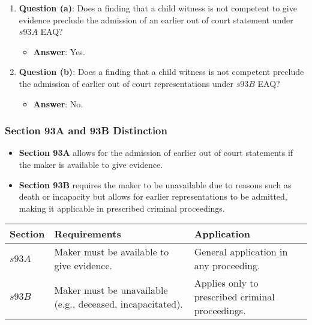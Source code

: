 \begin{enumerate}
\def\labelenumi{\arabic{enumi}.}
\tightlist
\item
  \textbf{Question (a)}: Does a finding that a child witness is not
  competent to give evidence preclude the admission of an earlier out of
  court statement under \(s93A\) EAQ?

  \begin{itemize}
  \tightlist
  \item
    \textbf{Answer}: Yes.
  \end{itemize}
\item
  \textbf{Question (b)}: Does a finding that a child witness is not
  competent preclude the admission of earlier out of court
  representations under \(s93B\) EAQ?

  \begin{itemize}
  \tightlist
  \item
    \textbf{Answer}: No.
  \end{itemize}
\end{enumerate}

\subsubsection{Section 93A and 93B
Distinction}\label{section-93a-and-93b-distinction}

\begin{itemize}
\item
  \textbf{Section 93A} allows for the admission of earlier out of court
  statements if the maker is available to give evidence.
\item
  \textbf{Section 93B} requires the maker to be unavailable due to
  reasons such as death or incapacity but allows for earlier
  representations to be admitted, making it applicable in prescribed
  criminal proceedings.
\end{itemize}

\begin{longtable}[]{@{}
  >{\raggedright\arraybackslash}p{}
  >{\raggedright\arraybackslash}p{}
  >{\raggedright\arraybackslash}p{}@{}}
\toprule\noalign{}
\begin{minipage}[b]{\linewidth}\raggedright
Section
\end{minipage} & \begin{minipage}[b]{\linewidth}\raggedright
Requirements
\end{minipage} & \begin{minipage}[b]{\linewidth}\raggedright
Application
\end{minipage} \\
\midrule\noalign{}
\endhead
\bottomrule\noalign{}
\endlastfoot
\(s93A\) & Maker must be available to give evidence. & General
application in any proceeding. \\
\(s93B\) & Maker must be unavailable (e.g., deceased, incapacitated). &
Applies only to prescribed criminal proceedings. \\
\end{longtable}

